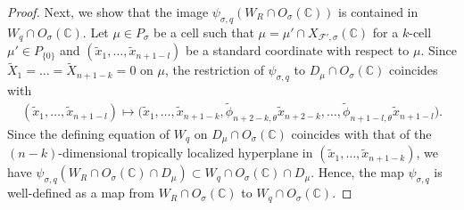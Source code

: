 \documentclass[10pt,a4paper]{amsart}
\numberwithin{equation}{section}
\begin{document}
\begin{proof}
Next, we show that the image $\psi_{\sigma,q}(W_R \cap O_\sigma({\mathbb C}))$ is contained in $W_q \cap O_\sigma({\mathbb C})$. Let $\mu \in P_\sigma$ be a cell such that $\mu = \mu' \cap X_{{\mathcal F}',\sigma}({\mathbb C})$ for a $k$-cell $\mu' \in P_{\{0\}}$ and $(\tilde{x}_1, \dots, \tilde{x}_{n+1-l})$ be a standard coordinate with respect to $\mu$. Since $\widetilde{X}_1=\dots=\widetilde{X}_{n+1-k}=0$ on $\mu$, the restriction of $\psi_{\sigma,q}$ to $D_\mu \cap O_\sigma({\mathbb C})$ coincides with
\begin{gather*}%
(\tilde{x}_1, \dots, \tilde{x}_{n+1-l}) \mapsto
\big(\tilde{x}_1, \dots, \tilde{x}_{n+1-k}, \tilde{\phi}_{n+2-k,\theta}\tilde{x}_{n+2-k}, \dots, \tilde{\phi}_{n+1-l,\theta} \tilde{x}_{n+1-l}\big).
\end{gather*}
Since the def\/ining equation of $W_q$ on $D_\mu \cap O_\sigma({\mathbb C})$ coincides with that of the $(n-k)$-dimensional tropically localized hyperplane in $(\tilde{x}_1, \dots, \tilde{x}_{n+1-k})$, we have $\psi_{\sigma,q} \left(W_R \cap O_\sigma({\mathbb C}) \cap D_\mu \right) \subset W_q \cap O_\sigma({\mathbb C}) \cap D_\mu$. Hence, the map $\psi_{\sigma,q}$ is well-def\/ined as a map from $W_R \cap O_\sigma({\mathbb C})$ to $W_q \cap O_\sigma({\mathbb C})$.
\end{proof}
\end{document}

